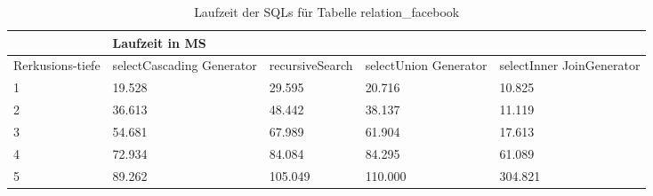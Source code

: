 \begin{table}[H]
	\begin{tabular}{l|l|l|l|l|l|}
		\cline{2-6}
		& \multicolumn{5}{|l|}{Laufzeit in MS}                                                                                                                                                  \\ \hline
		\multicolumn{1}{|l|}{\multirow{2}{2cm}{Rerkusions-tiefe}} & \multicolumn{2}{|l|}{\multirow{2}{3cm}{selectCascading Generator}} & \multirow{2}{2.8cm}{recursiveSearch} & \multirow{2}{2.5cm}{selectUnion Generator} & \multirow{2}{2.5cm}{selectInner JoinGenerator} \\
		\multicolumn{1}{|l|}{}
		& \multicolumn{2}{|l|}{}                                           &                                  &                                     &                                           \\ \hline
		\multicolumn{1}{|l|}{1}                                 & \multicolumn{2}{l|}{19.528}                                      & 29.595                                                & 20.716                                                    & 10.825                                                          \\ \hline
		\multicolumn{1}{|l|}{2}                                 & \multicolumn{2}{l|}{36.613}                                      & 48.442                                                & 38.137                                                    & 11.119                                                          \\ \hline
		\multicolumn{1}{|l|}{3}                                 & \multicolumn{2}{l|}{54.681}                                      & 67.989                                                & 61.904                                                    & 17.613                                                          \\ \hline
		\multicolumn{1}{|l|}{4}                                 & \multicolumn{2}{l|}{72.934}                                      & 84.084                                                & 84.295                                                    & 61.089                                                          \\ \hline
		\multicolumn{1}{|l|}{5}                                 & \multicolumn{2}{l|}{89.262}                                      & 105.049                                               & 110.000                                                   & 304.821                                                         \\ \hline
		
		
	\end{tabular}
	\caption{Laufzeit der SQLs für Tabelle relation\_facebook}
\end{table}

